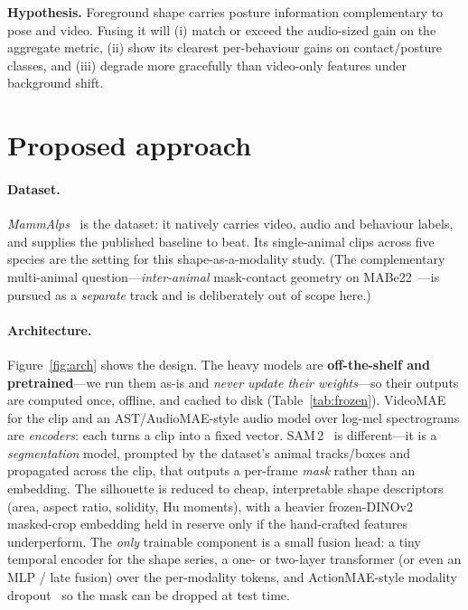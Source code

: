 \documentclass[11pt]{article}
\begin{document}
\noindent\textbf{Hypothesis.} Foreground shape carries posture information complementary to pose and video. Fusing it will (i) match or exceed the audio-sized gain on the aggregate metric, (ii) show its clearest per-behaviour gains on contact/posture classes, and (iii) degrade more gracefully than video-only features under background shift.

\section{Proposed approach}
\paragraph{Dataset.} \emph{MammAlps}~\cite{mammalps} is the dataset: it natively carries video, audio and behaviour labels, and supplies the published baseline to beat. Its single-animal clips across five species are the setting for this shape-as-a-modality study. (The complementary multi-animal question---\emph{inter-animal} mask-contact geometry on MABe22~\cite{mabe22}---is pursued as a \emph{separate} track and is deliberately out of scope here.)

\paragraph{Architecture.} Figure~\ref{fig:arch} shows the design. The heavy models are \textbf{off-the-shelf and pretrained}---we run them as-is and \emph{never update their weights}---so their outputs are computed once, offline, and cached to disk (Table~\ref{tab:frozen}). VideoMAE for the clip and an AST/AudioMAE-style audio model over log-mel spectrograms are \emph{encoders}: each turns a clip into a fixed vector. SAM\,2~\cite{sam2} is different---it is a \emph{segmentation} model, prompted by the dataset's animal tracks/boxes and propagated across the clip, that outputs a per-frame \emph{mask} rather than an embedding. The silhouette is reduced to cheap, interpretable shape descriptors (area, aspect ratio, solidity, Hu moments), with a heavier frozen-DINOv2~\cite{dinov2} masked-crop embedding held in reserve only if the hand-crafted features underperform. The \emph{only} trainable component is a small fusion head: a tiny temporal encoder for the shape series, a one- or two-layer transformer (or even an MLP / late fusion) over the per-modality tokens, and ActionMAE-style modality dropout~\cite{actionmae} so the mask can be dropped at test time.
\end{document}
